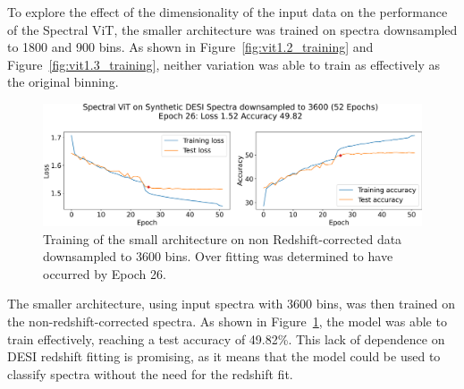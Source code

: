 To explore the effect of the dimensionality of the input data on the performance of the Spectral ViT, the smaller architecture was trained on spectra downsampled to 1800 and 900 bins. As shown in Figure~\ref{fig:vit1.2_training} and Figure~\ref{fig:vit1.3_training},
neither variation was able to train as effectively as the original binning. 

\begin{figure}[t!]
    \centering
    \includegraphics[width=.85\linewidth]{figures/v2_real/vit_model_V2training_new.png}
    \caption[Training of Spectral ViT: V2]{Training of the small architecture on non Redshift-corrected data downsampled to 3600 bins. Over fitting was determined to have occurred by Epoch 26.}
    \label{fig:vit2_training}
\end{figure}
The smaller architecture, using input spectra with 3600 bins, was then trained on the
non-redshift-corrected spectra. As shown in Figure~\ref{fig:vit2_training},
the model was able to train effectively, reaching a test accuracy of 49.82\%. 
This lack of dependence on DESI redshift fitting is promising, as it means that 
the model could be used to classify spectra without the need for the redshift fit. 


